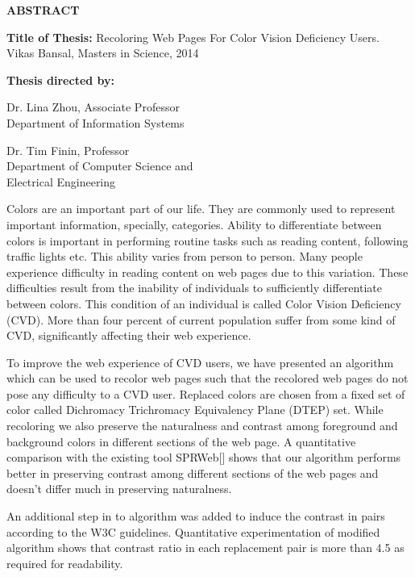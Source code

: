 \newpage
\pagestyle{empty}

\begin{center}
\vspace{0.1in}
\large{\bf ABSTRACT} \par  
\bigskip \bigskip
\end{center}

\begin{flushleft}
{\bf Title of Thesis:} Recoloring Web Pages For Color Vision Deficiency Users.\\
Vikas Bansal, Masters in Science, 2014 \\
\begin{singlespace}
{\bf Thesis directed by:}{\hspace{2.5mm}} \parbox[t]{3in}{Dr. Lina Zhou, Associate Professor\\
Department of Information Systems}
\end{singlespace}
\begin{singlespace}
{\hspace{37.9mm}}\parbox[t]{3in}{Dr. Tim Finin, Professor\\
Department of Computer Science and \\ Electrical Engineering}
\end{singlespace}
\end{flushleft}

Colors are an important part of our life. They are commonly used to represent important information, specially, categories. Ability to differentiate between colors is important in performing routine tasks such as reading content, following traffic lights etc. This ability varies from person to person. Many people experience difficulty in reading content on web pages due to this variation. These difficulties result from the inability of individuals to sufficiently differentiate between colors. This condition of an individual is called Color Vision Deficiency (CVD). More than four percent of current population suffer from some kind of CVD, significantly affecting their web experience.

To improve the web experience of CVD users, we have presented an algorithm which can be used to recolor web pages such that the recolored web pages do not pose any difficulty to a CVD user. Replaced colors are chosen from a fixed set of color called Dichromacy Trichromacy Equivalency Plane (DTEP) set. While recoloring we also preserve the naturalness and contrast among foreground and background colors in different sections of the web page. A quantitative comparison with the existing tool SPRWeb[] shows that our algorithm performs better in preserving contrast among different sections of the web pages and doesn’t differ much in preserving naturalness.

An additional step in to algorithm was added to induce the contrast in pairs according to the W3C guidelines. Quantitative experimentation of modified algorithm shows that contrast ratio in each replacement pair is more than 4.5 as required for readability. 

\par\vfil

